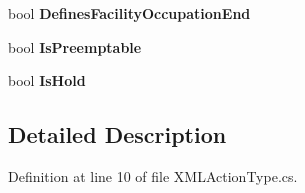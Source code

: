 \begin{DoxyCompactItemize}
\item 
bool {\bfseries Defines\+Facility\+Occupation\+End}\hypertarget{class_general_health_care_elements_1_1_input_1_1_x_m_l_input_classes_1_1_x_m_l_action_type_a638e917f14a3071e301cf04763705f02}{}\label{class_general_health_care_elements_1_1_input_1_1_x_m_l_input_classes_1_1_x_m_l_action_type_a638e917f14a3071e301cf04763705f02}

\item 
bool {\bfseries Is\+Preemptable}\hypertarget{class_general_health_care_elements_1_1_input_1_1_x_m_l_input_classes_1_1_x_m_l_action_type_a14ccf6d2fb0c23794bcfec182563fd33}{}\label{class_general_health_care_elements_1_1_input_1_1_x_m_l_input_classes_1_1_x_m_l_action_type_a14ccf6d2fb0c23794bcfec182563fd33}

\item 
bool {\bfseries Is\+Hold}\hypertarget{class_general_health_care_elements_1_1_input_1_1_x_m_l_input_classes_1_1_x_m_l_action_type_ad3387dbcbb92f3cf36e3bb1d74d2e4a6}{}\label{class_general_health_care_elements_1_1_input_1_1_x_m_l_input_classes_1_1_x_m_l_action_type_ad3387dbcbb92f3cf36e3bb1d74d2e4a6}

\end{DoxyCompactItemize}


\subsection{Detailed Description}


Definition at line 10 of file X\+M\+L\+Action\+Type.\+cs.

